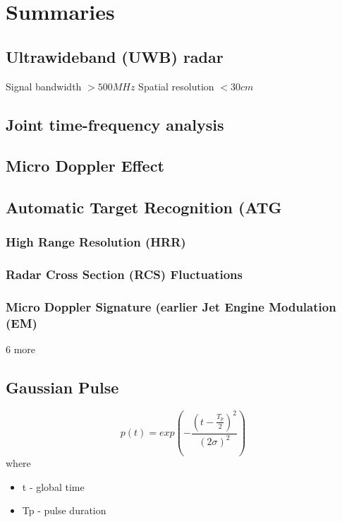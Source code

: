 \chapter{Summaries}

\section{Ultrawideband (UWB) radar}

Signal bandwidth $>500MHz$
Spatial resolution $<30 cm$ 

\section{Joint time-frequency analysis}

\section{Micro Doppler Effect}

\section{Automatic Target Recognition (ATG}

\subsection{High Range Resolution (HRR)}
\subsection{Radar Cross Section (RCS) Fluctuations}
\subsection{Micro Doppler Signature (earlier Jet Engine Modulation (EM)}
6 more



\section{Gaussian Pulse}
\begin{equation}
    p(t) = exp(-\frac{(t-\frac{T_p}{2})^2}{(2\sigma)^2})
\end{equation}
where
\begin{itemize}
    \item t - global time
    \item Tp - pulse duration
    
\end{itemize}

